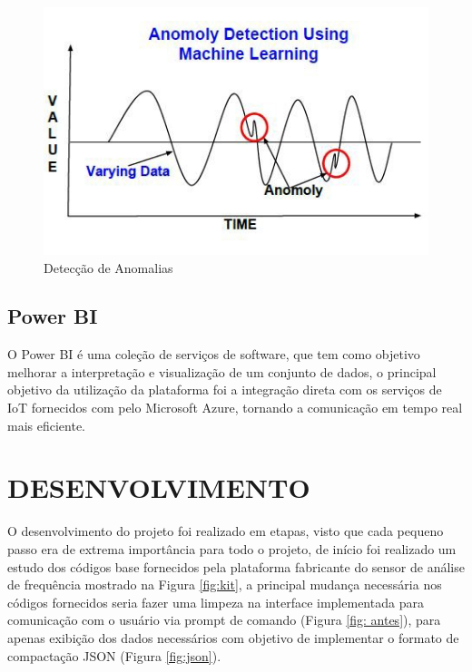 \documentclass[
	article,			%
	12pt,				%
	oneside,			%
	a4paper,			%
	section=TITLE,		%
	subsection=TITLE,	%
	english,			%
	brazil,				%
	sumario=tradicional
	]{abntex2}
\begin{document}
\begin{figure}[H]
    \centering
    \includegraphics[scale=0.5]{anomaly.png}
    \caption{Detecção de Anomalias}
    \label{fig:anomalias}
\end{figure}

\subsection*{Power BI}
O Power BI é uma coleção de serviços de software, que tem como objetivo melhorar a interpretação e visualização de um conjunto de dados, o principal objetivo da utilização da plataforma foi a integração direta com os serviços de IoT fornecidos com pelo Microsoft Azure, tornando a comunicação em tempo real mais eficiente. 

\section*{DESENVOLVIMENTO}
O desenvolvimento do projeto foi realizado em etapas, visto que cada pequeno passo era de extrema importância para todo o projeto,  de início foi realizado um estudo dos códigos base fornecidos  pela plataforma  fabricante do sensor de análise de frequência mostrado na Figura \ref{fig:kit}, a principal mudança necessária nos códigos fornecidos seria  fazer uma limpeza na interface implementada para comunicação com o usuário via prompt de comando (Figura \ref{fig: antes}), para apenas exibição dos dados necessários com  objetivo de implementar o formato de compactação JSON (Figura \ref{fig:json}).
\end{document}
